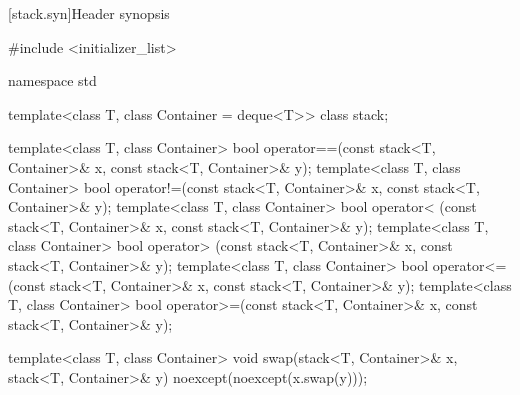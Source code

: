 [stack.syn]{Header  synopsis}%
%

\begin{codeblock}
#include <initializer_list>

namespace std {
  template<class T, class Container = deque<T>> class stack;

  template<class T, class Container>
    bool operator==(const stack<T, Container>& x, const stack<T, Container>& y);
  template<class T, class Container>
    bool operator!=(const stack<T, Container>& x, const stack<T, Container>& y);
  template<class T, class Container>
    bool operator< (const stack<T, Container>& x, const stack<T, Container>& y);
  template<class T, class Container>
    bool operator> (const stack<T, Container>& x, const stack<T, Container>& y);
  template<class T, class Container>
    bool operator<=(const stack<T, Container>& x, const stack<T, Container>& y);
  template<class T, class Container>
    bool operator>=(const stack<T, Container>& x, const stack<T, Container>& y);

  template<class T, class Container>
    void swap(stack<T, Container>& x, stack<T, Container>& y) noexcept(noexcept(x.swap(y)));
}
\end{codeblock}

